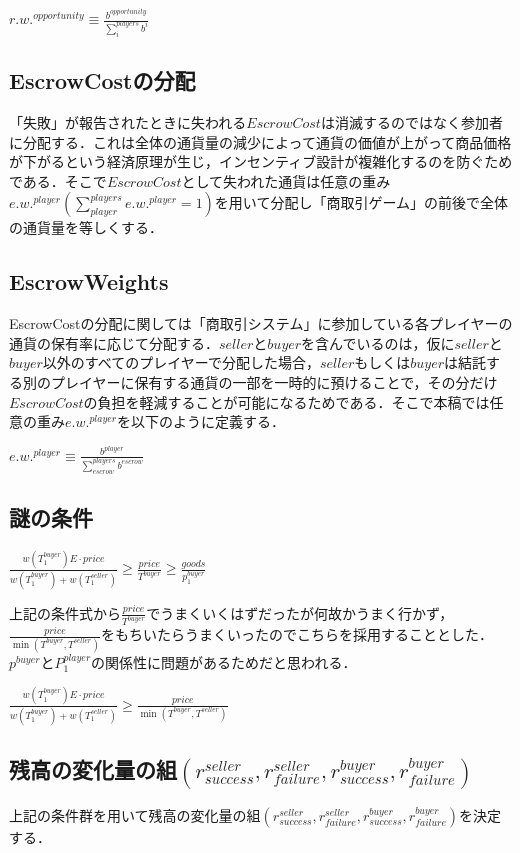 \documentclass[twocolumn, a4j]{article}
\begin{document}
$ r.w.^{opportunity} \equiv \frac{b^{opportunity}}{\sum^{players}_{i}b^{i}} $


\subsection{EscrowCostの分配}
「失敗」が報告されたときに失われる$ EscrowCost $は消滅するのではなく参加者に分配する．これは全体の通貨量の減少によって通貨の価値が上がって商品価格が下がるという経済原理が生じ，インセンティブ設計が複雑化するのを防ぐためである．そこで$ EscrowCost $として失われた通貨は任意の重み$ e.w.^{player} (\sum^{players}_{player}e.w.^{player} = 1) $を用いて分配し「商取引ゲーム」の前後で全体の通貨量を等しくする．

\subsection{EscrowWeights}
EscrowCostの分配に関しては「商取引システム」に参加している各プレイヤーの通貨の保有率に応じて分配する．$ seller $と$ buyer $を含んでいるのは，仮に$ seller $と$ buyer $以外のすべてのプレイヤーで分配した場合，$ seller $もしくは$ buyer $は結託する別のプレイヤーに保有する通貨の一部を一時的に預けることで，その分だけ$ EscrowCost $の負担を軽減することが可能になるためである．そこで本稿では任意の重み$ e.w.^{player} $を以下のように定義する．

$ e.w.^{player} \equiv \frac{b^{player}}{\sum^{players}_{escrow}b^{escrow}} $

\subsection{謎の条件}
$ \frac{w(T^{buyer}_1)E \cdot price}{w(T^{buyer}_1) + w(T^{seller}_1)} \geq \frac{price}{T^{buyer}} \geq \frac{goods}{p^{buyer}_1} $

上記の条件式から$ \frac{price}{ T^{buyer} } $でうまくいくはずだったが何故かうまく行かず，$ \frac{price}{ \min(T^{buyer}, T^{seller})} $をもちいたらうまくいったのでこちらを採用することとした．$ p^{buyer} $と$ P^{player}_1 $の関係性に問題があるためだと思われる．

$ \frac{w(T^{buyer}_1)E \cdot price}{w(T^{buyer}_1) + w(T^{seller}_1)} \geq \frac{price}{ \min(T^{buyer}, T^{seller})} $


\subsection{残高の変化量の組$ (r^{seller}_{success}, r^{seller}_{failure}, r^{buyer}_{success}, r^{buyer}_{failure}) $}
上記の条件群を用いて残高の変化量の組$ (r^{seller}_{success}, r^{seller}_{failure}, r^{buyer}_{success}, r^{buyer}_{failure}) $を決定する．
\end{document}
